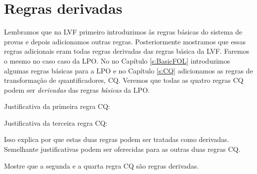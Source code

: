 \chapter{Regras derivadas}\label{s:DerivedFOL}
Lembramos que na LVF  primeiro introduzimos \`as regras b\'asicas do sistema de provas  e depois adicionamos outras regras.  Posteriormente mostramos que essas regras adicionais eram todas regras derivadas das regras b\'asica da LVF.  Faremos o mesmo no caso caso da LPO.  No no Capítulo  \ref{s:BasicFOL} introduzimos algumas regras b\'asicas para a LPO e no Capítulo  \ref{s:CQ} adicionamos  as  regras de transforma\c c\~ao de quantificadores, CQ.  Veremos que todas as quatro regras CQ podem ser \emph{derivadas} das regras \emph{b\'asicas} da LPO.  

Justificativa da primeira regra CQ:
\begin{fitchproof}
	\open
		\open
		\close
	\close
\end{fitchproof}
Justificativa da terceira regra CQ:
   
\begin{fitchproof}
	\open
		\open
		\close
	\close
\end{fitchproof}
Isso explica por que estas duas regras podem ser tratadas como derivadas. Semelhante justificativas podem ser oferecidas para as outras duas regras CQ.

\practiceproblems

\problempart
Mostre que a segunda e a quarta regra  CQ s\~ao regras derivadas.

